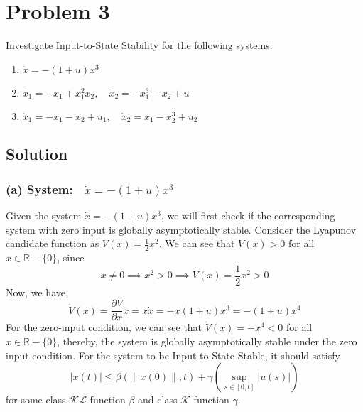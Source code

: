 \section*{Problem 3}

Investigate Input-to-State Stability for the following systems:
\begin{enumerate}[label= (\alph*)]
    \item \( \dot{x}=-(1+u) x^{3} \)
    \item \( \dot{x}_{1}=-x_{1}+x_{1}^{2} x_{2}, \quad \dot{x}_{2}=-x_{1}^{3}-x_{2}+u \)
    \item \( \dot{x}_{1}=-x_{1}-x_{2}+u_{1}, \quad \dot{x}_{2}=x_{1}-x_{2}^{3}+u_{2} \)
\end{enumerate}

\subsection*{Solution}

\subsubsection*{(a) System:\( \quad \dot{x}=-(1+u) x^{3} \)}

Given the system \( \dot{x}=-(1+u) x^{3} \), we will first check if the corresponding system with zero input is globally asymptotically stable.
Consider the Lyapunov candidate function as \( V(x)=\frac{1}{2} x^{2} \).
We can see that \( V(x) > 0 \) for all \( x \in \mathbb{R} - \{ 0 \} \), since
\begin{equation*}
    x \neq 0
    \implies
    x^2 > 0
    \implies
    V(x)
    =
    \frac{1}{2} x^2 > 0
\end{equation*}
Now, we have,
\begin{equation*}
    \dot{V}(x)
    =
    \frac{\partial V}{\partial x} \dot{x}
    =
    x \dot{x}
    =
    -x (1 + u) x^3
    =
    -(1 + u) x^4
\end{equation*}
For the zero-input condition, we can see that \( \dot{V}(x) = -x^4 < 0 \) for all \( x \in \mathbb{R} - \{ 0 \} \), thereby, the system is globally asymptotically stable under the zero input condition.
For the system to be Input-to-State Stable, it should satisfy
\begin{equation*}
    \left| x(t) \right| \leq \beta( \| x(0) \|, t ) + \gamma( \sup_{s \in [0, t]} \left| u(s) \right| )
\end{equation*}
for some class-\( \mathcal{KL} \) function \( \beta \) and class-\( \mathcal{K} \) function \( \gamma \).

